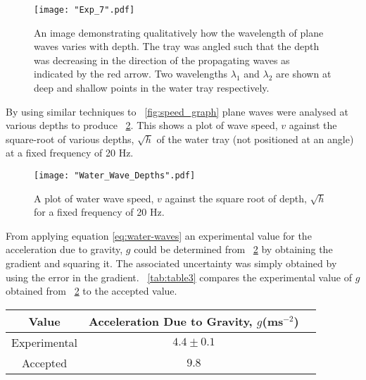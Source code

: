 \documentclass{article}
\newcommand{\figref}[2][\figurename~]{#1\ref{#2}}
\newcommand{\tabref}[2][\tablename~]{#1\ref{#2}}
\begin{document}
\begin{figure}[h]
\centering
\texttt{[image: "Exp\_7".pdf]}
\caption{An image demonstrating qualitatively how the wavelength of plane waves varies with depth. The tray was angled such that the depth was decreasing in the direction of the propagating waves as indicated by the red arrow. Two wavelengths $\lambda_1$ and $\lambda_2$ are shown at deep and shallow points in the water tray respectively.}
\label{fig:tray_depth}
\end{figure}

\vspace{2mm}
\noindent
By using similar techniques to \figref{fig:speed_graph} plane waves were analysed at various depths to produce \figref{fig:depth_graph}. This shows a plot of wave speed, $v$ against the square-root of various depths, $\sqrt{h}$ of the water tray (not positioned at an angle) at a fixed frequency of 20 Hz.

\begin{figure}[h]
\centering
\texttt{[image: "Water\_Wave\_Depths".pdf]}
\caption{A plot of water wave speed, $v$ against the square root of depth, $\sqrt{h}$ for a fixed frequency of 20 Hz.}
\label{fig:depth_graph}
\end{figure}

\cleardoublepage
\vspace{2mm}
\noindent
From applying equation \eqref{eq:water-waves} an experimental value for the acceleration due to gravity, $g$ could be determined from \figref{fig:depth_graph} by obtaining the gradient and squaring it. The associated uncertainty  was simply obtained by using the error in the gradient. \tabref{tab:table3} compares the experimental value of $g$ obtained from \figref{fig:depth_graph} to the accepted value.


\vspace{5mm}
\begin{table*}[h]
\centering %
\caption{Table of values for the acceleration due to gravity, $g$.}
\label{tab:table3}
\begin{tabular}{|c|c|c|}
\hline
Value & Acceleration Due to Gravity, $g$(ms$^{-2}$) \\
\hline
Experimental & $4.4 \pm 0.1$ \\
\hline
Accepted & $9.8$ \\
\hline
\end{tabular}
\end{table*}
\end{document}
